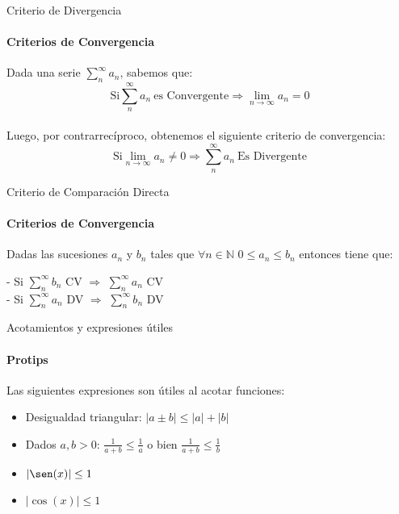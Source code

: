 \documentclass{plantillaPPT}
\begin{document}
\primeraDiapo



\begin{frame}{Criterio de Divergencia}
\framesubtitle{Criterios de Convergencia}

Dada una serie \(\displaystyle\sum_{n}^{\infty}a_n\), sabemos que:\\[2ex]
\[\text{Si} \sum_{n}^{\infty}a_n\ \text{es Convergente} \Rightarrow \lim_{n\to\infty}a_n = 0\]\\[2ex]
Luego, por contrarrecíproco, obtenemos el siguiente criterio de convergencia:
\[\text{Si} \lim_{n\to\infty}a_n \neq 0 \Rightarrow \sum_{n}^{\infty}a_n\ \text{Es Divergente}\]
    
\end{frame}

\begin{frame}{Criterio de Comparación Directa}
\framesubtitle{Criterios de Convergencia}

Dadas las sucesiones \(a_n\) y \(b_n\) tales que \(\forall n\in\mathbb{N}\) \(0\leq a_n\leq b_n\) entonces tiene que:\\[3ex]
\begin{center}
- Si \(\displaystyle\sum_{n}^\infty b_n\) CV \(\Rightarrow\) \(\displaystyle\sum_{n}^\infty a_n\) CV\\[3ex]
- Si \(\displaystyle\sum_{n}^\infty a_n\) DV \(\Rightarrow\) \(\displaystyle\sum_{n}^\infty b_n\) DV
\end{center}
    
\end{frame}

\begin{frame}{Acotamientos y expresiones útiles}
\framesubtitle{Protips}

Las siguientes expresiones son útiles al acotar funciones:
\vspace{5pt}
\begin{itemize}
    \item Desigualdad triangular: \(|a\pm b| \leq |a|+|b|\)
    \vspace{5pt}
    \item Dados \(a,b>0\): \(\frac{1}{a+b}\leq\frac{1}{a}\) o bien \(\frac{1}{a+b}\leq\frac{1}{b}\)
    \vspace{5pt}
    \item $|\sen(x)|\leq1$
    \item $|\cos(x)|\leq1$
\end{itemize}
    
\end{frame}
\end{document}
